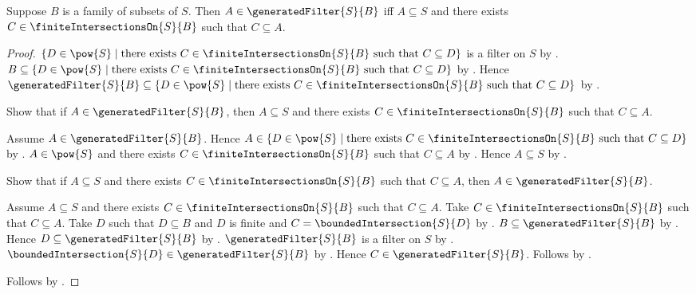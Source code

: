 \begin{theorem}\label{generated_filter_iff_finite_intersection_member}
    Suppose $B$ is a family of subsets of $S$.
    Then $A\in\generatedFilter{S}{B}$ iff
        $A\subseteq S$ and there exists
            $C\in\finiteIntersectionsOn{S}{B}$ such that $C\subseteq A$.
\end{theorem}
\begin{proof}
    $\{D\in\pow{S}\mid
        \text{there exists $C\in\finiteIntersectionsOn{S}{B}$ such that
            $C\subseteq D$}\}$ is a filter on $S$ by
        .
    $B\subseteq\{D\in\pow{S}\mid
        \text{there exists $C\in\finiteIntersectionsOn{S}{B}$ such that
            $C\subseteq D$}\}$ by
        .
    Hence $\generatedFilter{S}{B}\subseteq
        \{D\in\pow{S}\mid
            \text{there exists $C\in\finiteIntersectionsOn{S}{B}$ such that
                $C\subseteq D$}\}$ by .

    Show that if $A\in\generatedFilter{S}{B}$, then
        $A\subseteq S$ and there exists
            $C\in\finiteIntersectionsOn{S}{B}$ such that $C\subseteq A$.
    \begin{subproof}
        Assume $A\in\generatedFilter{S}{B}$.
        Hence $A\in\{D\in\pow{S}\mid
            \text{there exists $C\in\finiteIntersectionsOn{S}{B}$ such that
                $C\subseteq D$}\}$ by .
        $A\in\pow{S}$ and there exists
            $C\in\finiteIntersectionsOn{S}{B}$ such that $C\subseteq A$
            by \auto.
        Hence $A\subseteq S$ by .
    \end{subproof}

    Show that if $A\subseteq S$ and there exists
        $C\in\finiteIntersectionsOn{S}{B}$ such that $C\subseteq A$, then
        $A\in\generatedFilter{S}{B}$.
    \begin{subproof}
        Assume $A\subseteq S$ and there exists
            $C\in\finiteIntersectionsOn{S}{B}$ such that $C\subseteq A$.
        Take $C\in\finiteIntersectionsOn{S}{B}$ such that $C\subseteq A$.
        Take $D$ such that $D\subseteq B$ and $D$ is finite and
            $C=\boundedIntersection{S}{D}$
            by .
        $B\subseteq\generatedFilter{S}{B}$ by
            .
        Hence $D\subseteq\generatedFilter{S}{B}$ by
            .
        $\generatedFilter{S}{B}$ is a filter on $S$ by
            .
        $\boundedIntersection{S}{D}\in\generatedFilter{S}{B}$ by
            .
        Hence $C\in\generatedFilter{S}{B}$.
        Follows by .
    \end{subproof}
    Follows by \auto.
\end{proof}

